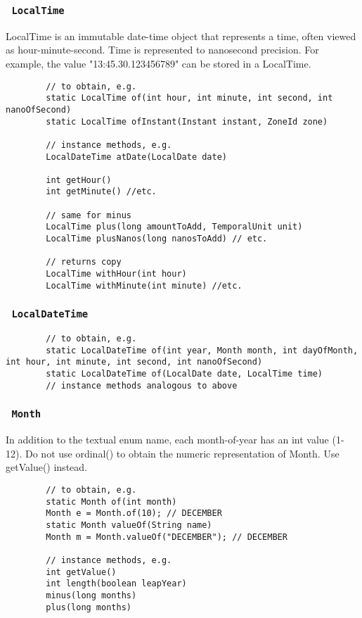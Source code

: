 \documentclass{scrartcl}
\begin{document}
\subsubsection{\lstinline$ LocalTime $}

    LocalTime is an immutable date-time object that represents a time, often viewed as hour-minute-second. Time is represented to nanosecond precision. For example, the value "13:45.30.123456789" can be stored in a LocalTime.

    \begin{lstlisting}
        // to obtain, e.g.
        static LocalTime of(int hour, int minute, int second, int nanoOfSecond)
        static LocalTime ofInstant(Instant instant, ZoneId zone)

        // instance methods, e.g.
        LocalDateTime atDate(LocalDate date)

        int getHour()
        int getMinute() //etc.

        // same for minus
        LocalTime plus(long amountToAdd, TemporalUnit unit)
        LocalTime plusNanos(long nanosToAdd) // etc.

        // returns copy
        LocalTime withHour(int hour)
        LocalTime withMinute(int minute) //etc.
        \end{lstlisting}

\subsubsection{\lstinline$ LocalDateTime $}

    \begin{lstlisting}
        // to obtain, e.g.
        static LocalDateTime of(int year, Month month, int dayOfMonth, int hour, int minute, int second, int nanoOfSecond)
        static LocalDateTime of(LocalDate date, LocalTime time)
        // instance methods analogous to above
    \end{lstlisting}

\subsubsection{\lstinline$ Month $}

    In addition to the textual enum name, each month-of-year has an int value (1-12).
    Do not use ordinal() to obtain the numeric representation of Month. Use getValue() instead.

    \begin{lstlisting}
        // to obtain, e.g.
        static Month of(int month)
        Month e = Month.of(10); // DECEMBER
        static Month valueOf(String name)
        Month m = Month.valueOf("DECEMBER"); // DECEMBER

        // instance methods, e.g.
        int getValue()
        int length(boolean leapYear)
        minus(long months)
        plus(long months)
    \end{lstlisting}
\end{document}
